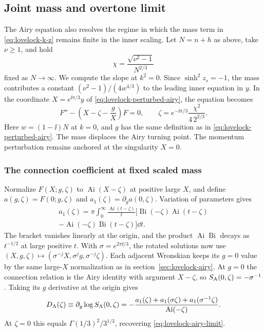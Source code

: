 \subsection{Joint mass and overtone limit}
\label{sec:lovelock-crossover}

The Airy equation also resolves the regime in which the mass
term in \eqref{eq:lovelock-k-z} remains finite in the inner scaling.
Let \(N=n+h\) as above, take \(\nu\geq1\), and hold
\begin{equation}
 \chi=\frac{\sqrt{\nu^2-1}}{N^{2/3}}
 \label{eq:lovelock-scaled-mass}
\end{equation}
fixed as \(N\to\infty\). We compute the slope at \(k^2=0\).
Since \(\sinh^2 z_s=-1\), the mass contributes a constant
\((\nu^2-1)/(4w^{4/3})\) to the leading inner equation in \(y\).
In the coordinate \(X=e^{\ii\pi/3}y\) of
\eqref{eq:lovelock-perturbed-airy}, the equation becomes
\begin{equation}
 F''-\left(X-\zeta-\frac gX\right) F=0,\qquad
 \zeta=e^{-\ii\pi/3}\frac{\chi^2}{4\,2^{2/3}}.
 \label{eq:lovelock-displaced-airy}
\end{equation}
Here \(w=(1-\ii)N\) at \(k=0\), and \(g\) has the same
definition as in \eqref{eq:lovelock-perturbed-airy}.
The mass displaces the Airy turning point. The momentum
perturbation remains anchored at the singularity \(X=0\).

\subsubsection{The connection coefficient at fixed scaled mass}

Normalize \(F(X;g,\zeta)\) to \(\operatorname{Ai}(X-\zeta)\)
at positive large \(X\), and define
\(a(g,\zeta)=F(0;g,\zeta)\) and
\(a_1(\zeta)=\partial_g a(0,\zeta)\).
Variation of parameters gives
\begin{multline}
 a_1(\zeta)=\pi\int_0^\infty\frac{\operatorname{Ai}(t-\zeta)}t
 \big[\operatorname{Bi}(-\zeta)\operatorname{Ai}(t-\zeta)\\
       -\operatorname{Ai}(-\zeta)\operatorname{Bi}(t-\zeta)\big]\dd t .
 \label{eq:lovelock-shifted-variation}
\end{multline}
The bracket vanishes linearly at the origin, and the product
\(\operatorname{Ai}\operatorname{Bi}\) decays as \(t^{-1/2}\)
at large positive \(t\). With \(\sigma=e^{2\pi\ii/3}\), the
rotated solutions now use
\((X,g,\zeta)\mapsto(\sigma^{-j}X,\sigma^j g,\sigma^{-j}\zeta)\).
Each adjacent Wronskian keeps its \(g=0\) value by the
same large-\(X\) normalization as in section~\ref{sec:lovelock-airy}.
At \(g=0\) the connection relation is the Airy identity
with argument \(X-\zeta\), so \(S_{\rm A}(0,\zeta)=-\sigma^{-1}\).
Taking its \(g\) derivative at the origin gives
\begin{equation}
 D_{\rm A}(\zeta)\equiv\partial_g\log S_{\rm A}(0,\zeta)
 =-\frac{a_1(\zeta)+a_1(\sigma\zeta)+a_1(\sigma^{-1}\zeta)}
         {\operatorname{Ai}(-\zeta)} .
 \label{eq:lovelock-displaced-connection}
\end{equation}
At \(\zeta=0\) this equals \(\Gamma(1/3)^2/3^{1/3}\), recovering
\eqref{eq:lovelock-airy-limit}.

